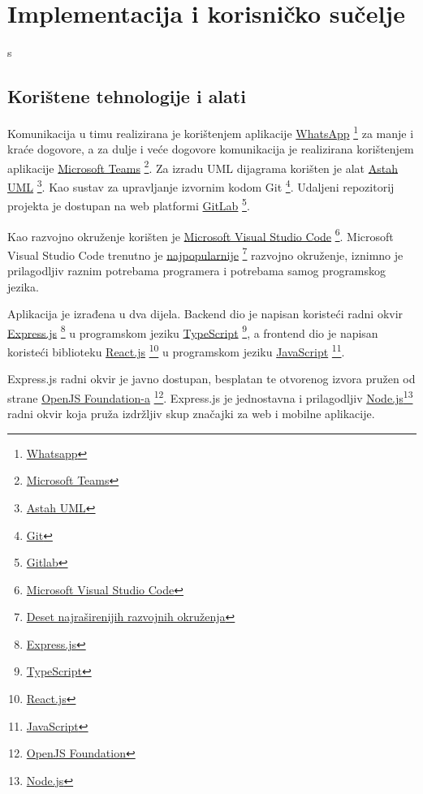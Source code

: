 \chapter{Implementacija i korisničko sučelje}s
		
		\section{Korištene tehnologije i alati}
		
			Komunikacija u timu realizirana je korištenjem aplikacije \underline{WhatsApp} \footnote{\href{https://www.whatsapp.com/}{Whatsapp}} za manje i
			kraće dogovore, a za dulje i veće dogovore komunikacija je realizirana korištenjem aplikacije \underline{Microsoft Teams} \footnote{\href{https://www.microsoft.com/hr-hr/microsoft-365/microsoft-teams/group-chat-software}{Microsoft Teams}}. Za izradu UML dijagrama korišten je alat \underline{Astah UML} \footnote{\href{https://astah.net/products/astah-uml/}{Astah UML}}. Kao sustav za upravljanje izvornim kodom Git \footnote{\href{https://git-scm.com/}{Git}}. Udaljeni repozitorij projekta je dostupan na web platformi \underline{GitLab} \footnote{\href{https://www.gitlab.com}{Gitlab}}.

            Kao razvojno okruženje korišten je \underline{Microsoft Visual Studio Code} \footnote{\href{https://code.visualstudio.com/}{Microsoft Visual Studio Code}}. Microsoft Visual Studio Code trenutno je \underline{najpopularnije} \footnote{\href{https://pypl.github.io/IDE.html}{Deset najraširenijih razvojnih okruženja}} razvojno okruženje, iznimno je prilagodljiv raznim potrebama programera i potrebama samog programskog jezika.
            
            Aplikacija je izrađena u dva dijela. Backend dio je napisan koristeći radni okvir \underline{Express.js} \footnote{\href{https://expressjs.com/}{Express.js}} u programskom jeziku \underline{TypeScript} \footnote{\href{https://www.typescriptlang.org/}{TypeScript}}, a frontend dio je napisan koristeći biblioteku \underline{React.js} \footnote{\href{https://reactjs.org/}{React.js}} u programskom jeziku \underline{JavaScript} \footnote{\href{https://www.javascript.com/}{JavaScript}}.
            
            Express.js radni okvir je javno dostupan, besplatan te otvorenog izvora pružen od strane \underline{OpenJS Foundation-a} \footnote{\href{https://openjsf.org/}{OpenJS Foundation}}. Express.js je jednostavna i prilagodljiv \underline{Node.js}\footnote{\href{https://nodejs.org/en/}{Node.js}} radni okvir koja pruža izdržljiv skup značajki za web i mobilne aplikacije.
            
